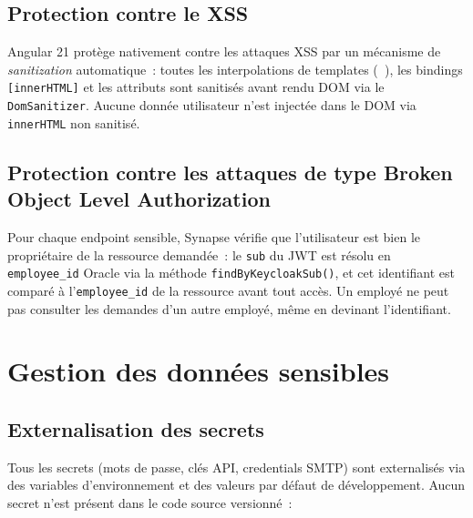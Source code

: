 \subsection{Protection contre le XSS}

Angular 21 protège nativement contre les attaques XSS par un mécanisme de
\textit{sanitization} automatique~: toutes les interpolations de templates
(\texttt{{{ }}}), les bindings \texttt{[innerHTML]} et les attributs sont
sanitisés avant rendu DOM via le \texttt{DomSanitizer}. Aucune donnée utilisateur
n’est injectée dans le DOM via \texttt{innerHTML} non sanitisé.

\subsection{Protection contre les attaques de type Broken Object Level Authorization}

Pour chaque endpoint sensible, Synapse vérifie que l’utilisateur est bien le
propriétaire de la ressource demandée~: le \texttt{sub} du JWT est résolu en
\texttt{employee\_id} Oracle via la méthode \texttt{findByKeycloakSub()}, et cet
identifiant est comparé à l'\texttt{employee\_id} de la ressource avant tout accès.
Un employé ne peut pas consulter les demandes d’un autre employé, même en devinant
l'identifiant.

\section{Gestion des données sensibles}

\subsection{Externalisation des secrets}

Tous les secrets (mots de passe, clés API, credentials SMTP) sont externalisés
via des variables d’environnement et des valeurs par défaut de développement.
Aucun secret n’est présent dans le code source versionné~:

